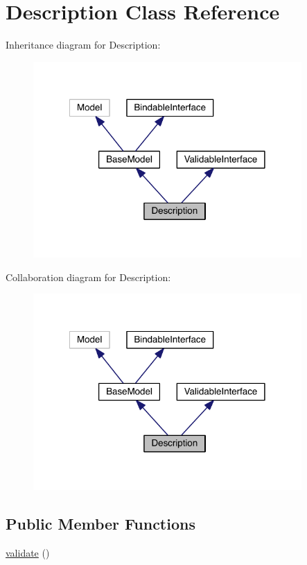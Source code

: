 \hypertarget{class_entity_1_1_description}{\section{Description Class Reference}
\label{class_entity_1_1_description}
}


Inheritance diagram for Description\-:
\nopagebreak
\begin{figure}[H]
\begin{center}
\leavevmode
\includegraphics[width=290pt]{class_entity_1_1_description__inherit__graph}
\end{center}
\end{figure}


Collaboration diagram for Description\-:
\nopagebreak
\begin{figure}[H]
\begin{center}
\leavevmode
\includegraphics[width=290pt]{class_entity_1_1_description__coll__graph}
\end{center}
\end{figure}
\subsection*{Public Member Functions}
\begin{DoxyCompactItemize}
\item 
\hyperlink{class_entity_1_1_description_a184909dab34698899937d810a9f5d393}{validate} ()
\end{DoxyCompactItemize}
